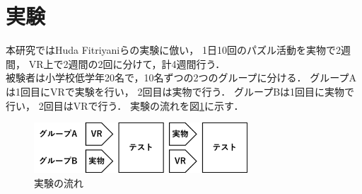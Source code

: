 \newpage
\section{実験}
  本研究ではHuda Fitriyaniらの実験\cite{puzzle}に倣い，
  1日10回のパズル活動を実物で2週間，
  VR上で2週間の2回に分けて，計4週間行う．
  \\\indent
  被験者は小学校低学年20名で，10名ずつの2つのグループに分ける．
  グループAは1回目にVRで実験を行い，
  2回目は実物で行う．
  グループBは1回目に実物で行い，
  2回目はVRで行う．
  実験の流れを図\ref{flow}に示す．
  \begin{figure}[h]
    \begin{center}
      \includegraphics[width=80mm]{./images/experiment.png}
      \caption{実験の流れ}\label{flow}
    \end{center}
  \end{figure}
